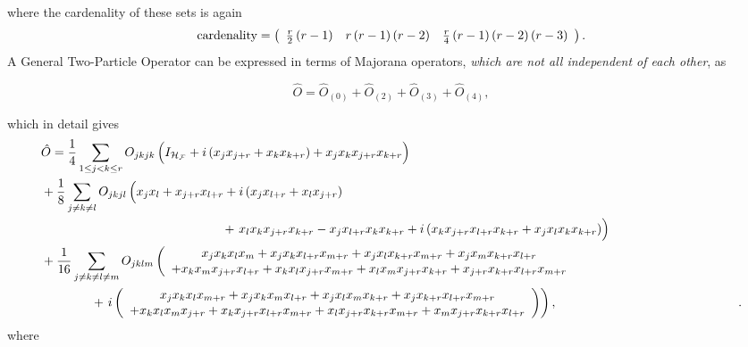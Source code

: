 \documentclass[aps,preprint]{revtex4}%
\begin{document}
where the cardenality of these sets is again
\begin{equation}
\text{cardenality}=\left(
\begin{array}
[c]{ccc}%
\frac{r}{2}\left(  r-1\right)   & r\left(  r-1\right)  \left(  r-2\right)   &
\frac{r}{4}\left(  r-1\right)  \left(  r-2\right)  \left(  r-3\right)
\end{array}
\right)  .
\end{equation}
A General Two-Particle Operator can be expressed in terms of Majorana
operators, \emph{which are not all independent of each other}, as%

\begin{equation}
\hat{O}=\hat{O}_{\left(  0\right)  }+\hat{O}_{\left(  2\right)  }+\hat
{O}_{\left(  3\right)  }+\hat{O}_{\left(  4\right)  },
\end{equation}


which in detail gives
\begin{align}
&  \hat{O}=\frac{1}{4}\sum_{1\leq j<k\leq r}O_{jkjk}\left(
\overset{}{I_{\mathcal{H}_{\mathcal{F}}}+i\left(  x_{j}x_{j+r}+x_{k}%
x_{k+r}\right)  +x_{j}x_{k}x_{j+r}x_{k+r}}\right) \\
&  +\frac{1}{8}\sum_{j\neq k\neq l}O_{jkjl}\left(  \overset{}{x_{j}%
x_{l}+x_{j+r}x_{l+r}+i\left(  x_{j}x_{l+r}+x_{l}x_{j+r}\right)  }\right. \\
&  \hspace{2in}+\left.  \overset{}{x_{l}x_{k}x_{j+r}x_{k+r}-x_{j}x_{l+r}%
x_{k}x_{k+r}+i\left(  x_{k}x_{j+r}x_{l+r}x_{k+r}+x_{j}x_{l}x_{k}%
x_{k+r}\right)  }\right) \\
&  +\frac{1}{16}\sum_{j\neq k\neq l\neq m}O_{jklm}\left(
\begin{array}
[c]{c}%
\overset{}{x_{j}x_{k}x_{l}x_{m}+x_{j}x_{k}x_{l+r}x_{m+r}+x_{j}x_{l}%
x_{k+r}x_{m+r}+x_{j}x_{m}x_{k+r}x_{l+r}}\\
+\overset{}{x_{k}x_{m}x_{j+r}x_{l+r}+x_{k}x_{l}x_{j+r}x_{m+r}+x_{l}%
x_{m}x_{j+r}x_{k+r}+x_{j+r}x_{k+r}x_{l+r}x_{m+r}}%
\end{array}
\right. \\
&  \qquad\quad\quad+\left.  i\left(
\begin{array}
[c]{c}%
\overset{}{x_{j}x_{k}x_{l}x_{m+r}+x_{j}x_{k}x_{m}x_{l+r}+x_{j}x_{l}%
x_{m}x_{k+r}+x_{j}x_{k+r}x_{l+r}x_{m+r}}\\
+\overset{}{x_{k}x_{l}x_{m}x_{j+r}+x_{k}x_{j+r}x_{l+r}x_{m+r}+x_{l}%
x_{j+r}x_{k+r}x_{m+r}+x_{m}x_{j+r}x_{k+r}x_{l+r}}%
\end{array}
\right)  \right)  ,\hspace{2in}.
\end{align}
where
\end{document}
